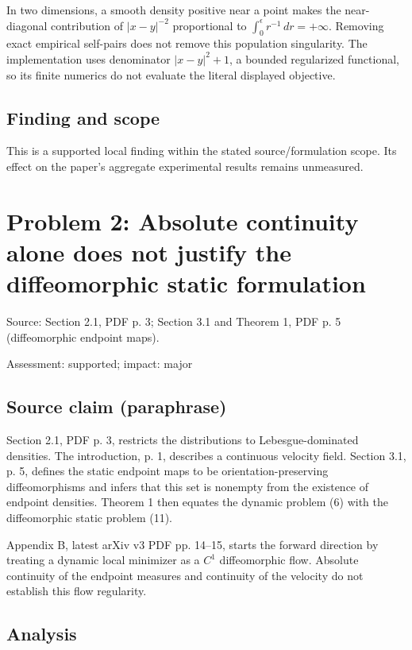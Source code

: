 \documentclass[11pt]{article}
\begin{document}
In two dimensions, a smooth density positive near a point makes the near-diagonal contribution of \(|x-y|^{-2}\) proportional to \(\int_0^\epsilon r^{-1}\,dr=+\infty\). Removing exact empirical self-pairs does not remove this population singularity. The implementation uses denominator \(|x-y|^2+1\), a bounded regularized functional, so its finite numerics do not evaluate the literal displayed objective.

\subsection*{Finding and scope}

This is a supported local finding within the stated source/formulation scope. Its effect on the paper's aggregate experimental results remains unmeasured.

\section*{Problem 2: Absolute continuity alone does not justify the diffeomorphic static formulation}

Source: Section 2.1, PDF p. 3; Section 3.1 and Theorem 1, PDF p. 5 (diffeomorphic endpoint maps).

Assessment: supported; impact: major

\subsection*{Source claim (paraphrase)}

Section 2.1, PDF p. 3, restricts the distributions to Lebesgue-dominated densities. The introduction, p. 1, describes a continuous velocity field. Section 3.1, p. 5, defines the static endpoint maps to be orientation-preserving diffeomorphisms and infers that this set is nonempty from the existence of endpoint densities. Theorem 1 then equates the dynamic problem (6) with the diffeomorphic static problem (11).

Appendix B, latest arXiv v3 PDF pp. 14–15, starts the forward direction by treating a dynamic local minimizer as a \(C^1\) diffeomorphic flow. Absolute continuity of the endpoint measures and continuity of the velocity do not establish this flow regularity.

\subsection*{Analysis}
\end{document}
